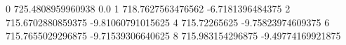 0 725.4808959960938 0.0
1 718.7627563476562 -6.7181396484375
2 715.6702880859375 -9.81060791015625
4 715.72265625 -9.75823974609375
6 715.7655029296875 -9.71539306640625
8 715.983154296875 -9.49774169921875
